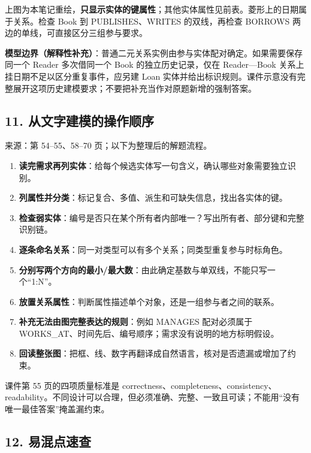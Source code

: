 上图为本笔记重绘，\textbf{只显示实体的键属性}；其他实体属性见前表。菱形上的日期属于关系。检查 Book 到 PUBLISHES、WRITES 的双线，再检查 BORROWS 两边的单线，可直接区分三组参与要求。

\textbf{模型边界（解释性补充）}：普通二元关系实例由参与实体配对确定。如果需要保存同一个 Reader 多次借同一个 Book 的独立历史记录，仅在 Reader---Book 关系上挂日期不足以区分重复事件，应另建 Loan 实体并给出标识规则。课件示意没有完整展开这项历史建模要求；不要把补充当作对原题新增的强制答案。

\subsection{11. 从文字建模的操作顺序}\label{02_er_modelling_zh-ux4eceux6587ux5b57ux5efaux6a21ux7684ux64cdux4f5cux987aux5e8f}

来源：第 54--55、58--70 页；以下为整理后的解题流程。

\begin{enumerate}
\def\labelenumi{\arabic{enumi}.}
\tightlist
\item
  \textbf{读完需求再列实体}：给每个候选实体写一句含义，确认哪些对象需要独立识别。
\item
  \textbf{列属性并分类}：标记复合、多值、派生和可缺失信息，找出各实体的键。
\item
  \textbf{检查弱实体}：编号是否只在某个所有者内部唯一？写出所有者、部分键和完整识别链。
\item
  \textbf{逐条命名关系}：同一对类型可以有多个关系；同类型重复参与时标角色。
\item
  \textbf{分别写两个方向的最小/最大数}：由此确定基数与单双线，不能只写一个``1:N''。
\item
  \textbf{放置关系属性}：判断属性描述单个对象，还是一组参与者之间的联系。
\item
  \textbf{补充无法由图完整表达的规则}：例如 MANAGES 配对必须属于 WORKS\_AT、时间先后、编号顺序；需求没有说明的地方标明假设。
\item
  \textbf{回读整张图}：把框、线、数字再翻译成自然语言，核对是否遗漏或增加了约束。
\end{enumerate}

课件第 55 页的四项质量标准是 correctness、completeness、consistency、readability。不同设计可以合理，但必须准确、完整、一致且可读；不能用``没有唯一最佳答案''掩盖漏约束。

\subsection{12. 易混点速查}\label{02_er_modelling_zh-ux6613ux6df7ux70b9ux901fux67e5}

